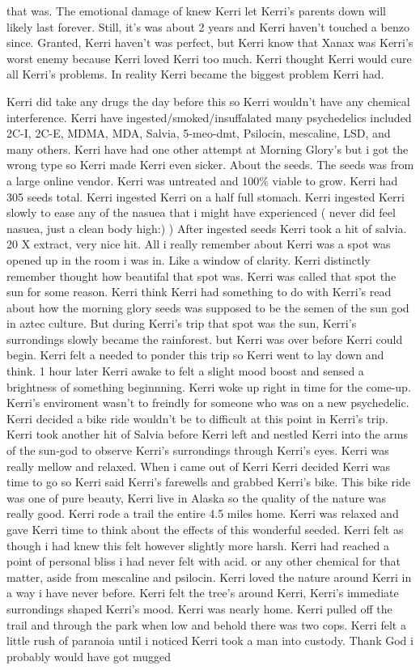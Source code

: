 \documentclass[12pt]{book}
\begin{document}
that was. The emotional damage of knew Kerri let Kerri's parents down will likely last forever. Still, it's was about 2 years and Kerri haven't touched a benzo since. Granted, Kerri haven't was perfect, but Kerri know that Xanax was Kerri's worst enemy because Kerri loved Kerri too much. Kerri thought Kerri would cure all Kerri's problems. In reality Kerri became the biggest problem Kerri had.



Kerri did take any drugs the day before this so Kerri wouldn't have any chemical interference. Kerri have ingested/smoked/insuffalated many psychedelics included 2C-I, 2C-E, MDMA, MDA, Salvia, 5-meo-dmt, Psilocin, mescaline, LSD, and many others. Kerri have had one other attempt at Morning Glory's but i got the wrong type so Kerri made Kerri even sicker. About the seeds. The seeds was from a large online vendor. Kerri was untreated and 100\% viable to grow. Kerri had 305 seeds total. Kerri ingested Kerri on a half full stomach. Kerri ingested Kerri slowly to ease any of the nasuea that i might have experienced ( never did feel nasuea, just a clean body high:) ) After ingested seeds Kerri took a hit of salvia. 20 X extract, very nice hit. All i really remember about Kerri was a spot was opened up in the room i was in. Like a window of clarity. Kerri distinctly remember thought how beautifal that spot was. Kerri was called that spot the sun for some reason. Kerri think Kerri had something to do with Kerri's read about how the morning glory seeds was supposed to be the semen of the sun god in aztec culture. But during Kerri's trip that spot was the sun, Kerri's surrondings slowly became the rainforest. but Kerri was over before Kerri could begin. Kerri felt a needed to ponder this trip so Kerri went to lay down and think. 1 hour later Kerri awake to felt a slight mood boost and sensed a brightness of something beginnning. Kerri woke up right in time for the come-up. Kerri's enviroment wasn't to freindly for someone who was on a new psychedelic. Kerri decided a bike ride wouldn't be to difficult at this point in Kerri's trip. Kerri took another hit of Salvia before Kerri left and nestled Kerri into the arms of the sun-god to observe Kerri's surrondings through Kerri's eyes. Kerri was really mellow and relaxed. When i came out of Kerri Kerri decided Kerri was time to go so Kerri said Kerri's farewells and grabbed Kerri's bike. This bike ride was one of pure beauty, Kerri live in Alaska so the quality of the nature was really good. Kerri rode a trail the entire 4.5 miles home. Kerri was relaxed and gave Kerri time to think about the effects of this wonderful seeded. Kerri felt as though i had knew this felt however slightly more harsh. Kerri had reached a point of personal bliss i had never felt with acid. or any other chemical for that matter, aside from mescaline and psilocin. Kerri loved the nature around Kerri in a way i have never before. Kerri felt the tree's around Kerri, Kerri's immediate surrondings shaped Kerri's mood. Kerri was nearly home. Kerri pulled off the trail and through the park when low and behold there was two cops. Kerri felt a little rush of paranoia until i noticed Kerri took a man into custody. Thank God i probably would have got mugged 
\end{document}
